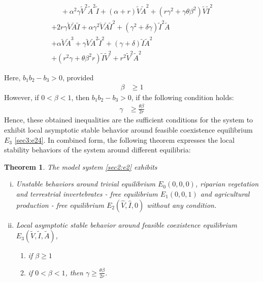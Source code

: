 \documentclass[12pt,a4wide]{report}
\newtheorem{theorem}{Theorem}[section]
\numberwithin{equation}{chapter}
\numberwithin{theorem}{chapter}
\begin{document}
\begin{enumerate}[i).]
\begin{equation}
\begin{split}
~~~~~~+ \alpha^2 \gamma\tilde V^2 \tilde A^2 \tilde I  +(\alpha + r)\tilde V \tilde A^2  + (r\gamma^2 + \gamma \theta \beta^2)\tilde V \tilde I^2  \\
+ 2r\gamma\tilde V \tilde A \tilde I  + \alpha \gamma^2\tilde V \tilde A \tilde I^2  + (\gamma^2+\delta \gamma)\tilde I^2\tilde A\\
+ \alpha\tilde V \tilde A^3  + \gamma\tilde V \tilde A^2\tilde I^2  + (\gamma + \delta)\tilde I \tilde A^2 \\ 
+(r^2\gamma + \theta \beta^2 r)\tilde I \tilde V^2 +r^2\tilde V^2\tilde A^2 
\end{split}
\end{equation}
\end{enumerate}
Here, $b_1b_2-b_3>0$, provided
\begin{align}\label{sec3:e36}
\beta &\geq 1
\end{align} 
However, if $0< \beta <1$, then $b_1b_2-b_3>0$, if the following condition holds:
\begin{align}\label{sec3:e36a}
\gamma &\geq \frac{\theta \beta}{2r}
\end{align} 
Hence, these obtained inequalities are the sufficient conditions for the system to exhibit local asymptotic stable behavior around feasible coexistence equilibrium $E_3$ \eqref{sec3:e24}.
In combined form, the following theorem expresses the local stability behaviors of the system around different equilibria:
\begin{theorem}\label{Theorem 3.4}
The model system \eqref{sec2:e2} exhibits
\begin{enumerate}[i)]
\item Unstable behaviors around trivial equilibrium $E_0(0,0,0)$, riparian vegetation and terrestrial invertebrates - free equilibrium $E_1(0,0,1)$ and agricultural production - free equilibrium $E_2(\hat V,\hat I,0)$ without any condition.
\item Local asymptotic stable behavior around feasible coexistence equilibrium $E_3(\tilde V,\tilde I,\tilde A)$, 
\begin{enumerate}
\item[a).] if $\beta\geq 1$
\item[b).] if $0<\beta<1$, then $\gamma \geq \frac{\theta \beta}{2r}$.
\end{enumerate}
\end{enumerate}
 \end{theorem}
\end{document}

